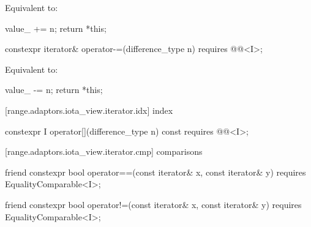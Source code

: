 {\begin{itemdescr}
\pnum
\effects Equivalent to:
\begin{codeblock}
value_ += n;
return *this;
\end{codeblock}
\end{itemdescr}

\begin{itemdecl}
constexpr iterator& operator-=(difference_type n)
  requires @@<I>;
\end{itemdecl}

\begin{itemdescr}
\pnum
\effects Equivalent to:
\begin{codeblock}
value_ -= n;
return *this;
\end{codeblock}
\end{itemdescr}

[range.adaptors.iota_view.iterator.idx]{ index}

\begin{itemdecl}
constexpr I operator[](difference_type n) const
  requires @@<I>;
\end{itemdecl}

\begin{itemdescr}
\pnum
\oldtxt{\returns} 
\end{itemdescr}

[range.adaptors.iota_view.iterator.cmp]{ comparisons}

\begin{itemdecl}
friend constexpr bool operator==(const iterator& x, const iterator& y)
  requires EqualityComparable<I>;
\end{itemdecl}

\begin{itemdescr}
\pnum
\oldtxt{\returns} 
\end{itemdescr}

\begin{itemdecl}
friend constexpr bool operator!=(const iterator& x, const iterator& y)
  requires EqualityComparable<I>;
\end{itemdecl}

}
